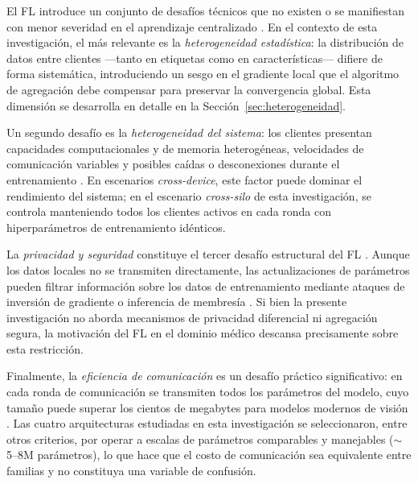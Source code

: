 El FL introduce un conjunto de desafíos técnicos que no existen o se manifiestan con menor
severidad en el aprendizaje centralizado \cite{DBLP:journals/corr/abs-1912-04977,
DBLP:journals/corr/abs-1908-07873}. En el contexto de esta investigación, el más relevante es
la \textit{heterogeneidad estadística}: la distribución de datos entre clientes —tanto en
etiquetas como en características— difiere de forma sistemática, introduciendo un sesgo en el
gradiente local que el algoritmo de agregación debe compensar para preservar la convergencia
global. Esta dimensión se desarrolla en detalle en la Sección~\ref{sec:heterogeneidad}.

Un segundo desafío es la \textit{heterogeneidad del sistema}: los clientes presentan capacidades
computacionales y de memoria heterogéneas, velocidades de comunicación variables y posibles
caídas o desconexiones durante el entrenamiento \cite{DBLP:journals/corr/abs-1908-07873}. En
escenarios \textit{cross-device}, este factor puede dominar el rendimiento del sistema; en el
escenario \textit{cross-silo} de esta investigación, se controla manteniendo todos los clientes
activos en cada ronda con hiperparámetros de entrenamiento idénticos.

La \textit{privacidad y seguridad} constituye el tercer desafío estructural del FL
\cite{DBLP:journals/corr/abs-1912-04977}. Aunque los datos locales no se transmiten
directamente, las actualizaciones de parámetros pueden filtrar información sobre los datos de
entrenamiento mediante ataques de inversión de gradiente o inferencia de membresía
\cite{DBLP:journals/corr/abs-1807-00459}. Si bien la presente investigación no aborda
mecanismos de privacidad diferencial ni agregación segura, la motivación del FL en el
dominio médico descansa precisamente sobre esta restricción.

Finalmente, la \textit{eficiencia de comunicación} es un desafío práctico significativo: en cada
ronda de comunicación se transmiten todos los parámetros del modelo, cuyo tamaño puede superar
los cientos de megabytes para modelos modernos de visión \cite{mahmud2026survey}. Las cuatro
arquitecturas estudiadas en esta investigación se seleccionaron, entre otros criterios, por operar
a escalas de parámetros comparables y manejables ($\sim$5--8M parámetros), lo que hace que el
costo de comunicación sea equivalente entre familias y no constituya una variable de confusión.

